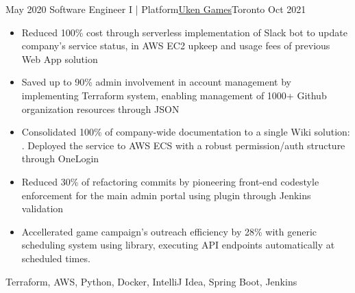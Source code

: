 %
%
%
\begin{experiences}
  \experience
    {May 2020}   {Software Engineer I | Platform}{\href{https://uken.com}{Uken Games}}{Toronto}
    {Oct 2021} {
                    \begin{itemize}
                        \item Reduced 100\% cost through serverless implementation of Slack bot to update company's service status, in AWS EC2 upkeep and usage fees of previous Web App solution
                        
                        \item Saved up to 90\% admin involvement in account management by implementing Terraform system, enabling management of 1000+ Github organization resources through JSON
                        
                        \item Consolidated 100\% of company-wide documentation to a single Wiki solution: . Deployed the service to AWS ECS with a robust permission/auth structure through OneLogin 

                        \item Reduced 30\% of refactoring commits by pioneering front-end codestyle enforcement for the main admin portal using  plugin through Jenkins validation

                        \item Accellerated game campaign's outreach efficiency by 28\% with generic scheduling system using  library, executing API endpoints automatically at scheduled times.
                    \end{itemize}
                    }
                    {Terraform, AWS, Python, Docker, IntelliJ Idea, Spring Boot, Jenkins}
\end{experiences}
